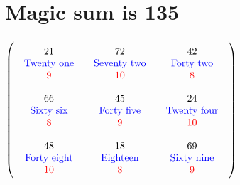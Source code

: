\documentclass{article}
\begin{document}
\vspace{2em} 
\section{Magic sum is 135}$ \left( \begin{array}{ccc}
\begin{array}{c}
\rule{0pt}{1.5em}21 \\ 
\text{\color{blue}Twenty one} \\ 
\color{red}9 \vspace{.5em} 
\end{array} & \begin{array}{c}
\rule{0pt}{1.5em}72 \\ 
\text{\color{blue}Seventy two} \\ 
\color{red}10 \vspace{.5em} 
\end{array} & \begin{array}{c}
\rule{0pt}{1.5em}42 \\ 
\text{\color{blue}Forty two} \\ 
\color{red}8 \vspace{.5em} 
\end{array}\\ 
\begin{array}{c}
\rule{0pt}{1.5em}66 \\ 
\text{\color{blue}Sixty six} \\ 
\color{red}8 \vspace{.5em} 
\end{array} & \begin{array}{c}
\rule{0pt}{1.5em}45 \\ 
\text{\color{blue}Forty five} \\ 
\color{red}9 \vspace{.5em} 
\end{array} & \begin{array}{c}
\rule{0pt}{1.5em}24 \\ 
\text{\color{blue}Twenty four} \\ 
\color{red}10 \vspace{.5em} 
\end{array}\\ 
\begin{array}{c}
\rule{0pt}{1.5em}48 \\ 
\text{\color{blue}Forty eight} \\ 
\color{red}10 \vspace{.5em} 
\end{array} & \begin{array}{c}
\rule{0pt}{1.5em}18 \\ 
\text{\color{blue}Eighteen} \\ 
\color{red}8 \vspace{.5em} 
\end{array} & \begin{array}{c}
\rule{0pt}{1.5em}69 \\ 
\text{\color{blue}Sixty nine} \\ 
\color{red}9 \vspace{.5em} 
\end{array}\end{array} \right) $
\end{document}
